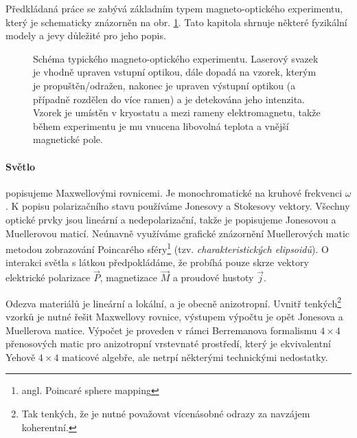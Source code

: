 Předkládaná práce se zabývá základním typem magneto-optického experimentu, který je schematicky znázorněn na obr. \ref{fig:uvodni-diagram}.
Tato kapitola shrnuje některé fyzikální modely a jevy důležité pro jeho popis.

\begin{figure}[htbp]
    \centering
    
    \caption{Schéma typického magneto-optického experimentu. 
    Laserový svazek je vhodně upraven vstupní optikou, dále dopadá na vzorek, kterým je propuštěn/odražen, nakonec je upraven výstupní optikou (a případně rozdělen do více ramen) a je detekována jeho intenzita. 
    Vzorek je umístěn v kryostatu a mezi rameny elektromagnetu, takže během experimentu je mu vnucena libovolná teplota a vnější magnetické pole.}
    \label{fig:uvodni-diagram}
\end{figure}


\paragraph{Světlo}
popisujeme Maxwellovými rovnicemi.
Je monochromatické na kruhové frekvenci $\omega$.
K popisu polarizačního stavu používáme Jonesovy a Stokesovy vektory.
Všechny optické prvky jsou lineární a nedepolarizační, takže je popisujeme Jonesovou a Muellerovou maticí\cite{gilReviewMuellerMatrix2014}.
Neúnavně využíváme grafické znázornění Muellerových matic metodou zobrazování Poincarého sféry\footnote{angl. Poincaré sphere mapping} (tzv. \emph{charakteristických elipsoidů})\cite{gilReviewMuellerMatrix2014,ossikovskiPoincareSphereMapping2013}.
O interakci světla s látkou předpokládáme, že probíhá pouze skrze vektory elektrické polarizace $\vec{P}$, magnetizace $\vec{M}$ a proudové hustoty $\vec{j}$. 

Odezva materiálů je lineární a lokální, a je obecně anizotropní. 
Uvnitř tenkých\footnote{Tak tenkých, že je nutné považovat vícenásobné odrazy za navzájem koherentní.} vzorků je nutné řešit Maxwellovy rovnice, výstupem výpočtu je opět Jonesova a Muellerova matice.
Výpočet je proveden v rámci Berremanova formalismu\cite{berremanOpticsStratifiedAnisotropic1972} $4\times 4$ přenosových matic pro anizotropní vrstevnaté prostředí, který je ekvivalentní Yehově $4\times 4$ maticové algebře\cite{yehElectromagneticPropagationBirefringent1979}, ale netrpí některými technickými nedostatky\cite{xuOpticalDegeneraciesAnisotropic2000,wuSingularitiesMatrixFormalisms2018,garibelloSingularityYehTransfer2020,bertrandGeneralAnalyticalTreatment2001}.
        
